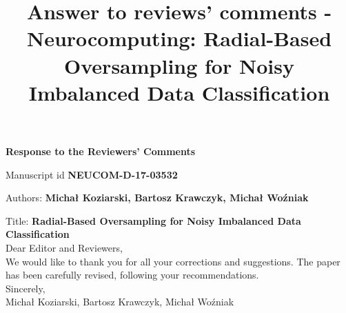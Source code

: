 \documentclass{article}
\begin{document}
\title{Answer to reviews' comments - Neurocomputing: Radial-Based Oversampling for Noisy Imbalanced Data Classification }
\begin{center}
\textbf{Response to the Reviewers’ Comments}
\end{center}


\noindent Manuscript id \textbf{NEUCOM-D-17-03532}
 
\noindent Authors: \textbf{Micha{\l} Koziarski, Bartosz Krawczyk, Micha{\l} Wo{\'z}niak}

\noindent Title: \textbf{Radial-Based Oversampling for Noisy Imbalanced Data Classification} \\

Dear Editor and Reviewers,\\

We would like to thank you for all your corrections and suggestions. The paper has been carefully revised, following your recommendations.\\


Sincerely,\\

Micha{\l} Koziarski, Bartosz Krawczyk, Micha{\l} Wo{\'z}niak


\newpage
\end{document}
